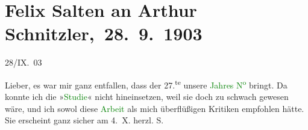 

\renewcommand{\erwaehnteOrte}{Orte: Wien}
\renewcommand{\erwaehnteWerke}{Werke: Die Zeit, Studie}
\section[ Felix Salten an Arthur Schnitzler, 28. 9. 1903]{Felix Salten an Arthur Schnitzler, 28. 9. 1903}
\nopagebreak{}
\rehead{ }\normalsize\beginnumbering{}
\toendnotes[C]{\smallbreak\pagebreak[2]}
\toendnotes[C]{\smallbreak}
\pstart
           \raggedleft{}{\pb}28/IX. 03\pend
           
\pstart
           Lieber, es war mir ganz entfallen, dass der 27.\textsuperscript{te} unsere \textcolor{green}{Jahres N\textsuperscript{o}}{}\ledrightnote{{$\rightarrow$}\textcolor{green}{Die Zeit}} bringt. Da konnte ich die »\textcolor{green}{Studie}{}\ledrightnote{\textcolor{green}{Studie}}« nicht
               hineinsetzen, weil sie doch zu schwach gewesen wäre, und ich sowol diese \textcolor{green}{Arbeit}{}\ledrightnote{{$\rightarrow$}\textcolor{green}{Studie}} als mich überflüßigen Kritiken empfohlen hätte. Sie
               erscheint ganz sicher am 4. X.\pend
           \pstart herzl. \spacefill\mbox{S.}\pend{}\endnumbering{}  
      